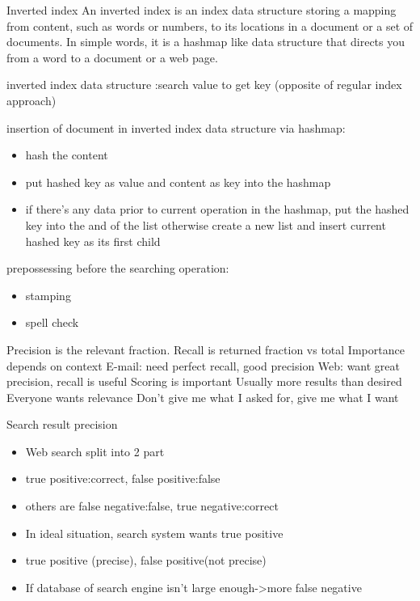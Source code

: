 \documentclass[fancy,11pt,titlestyle=display]{style/elegantbook}
\begin{document}
\begin{definition}{Inverted index}{}
An inverted index is an index data structure storing a mapping from content, such as words or numbers, to its locations in a document or a set of documents. In simple words, it is a hashmap like data structure that directs you from a word to a document or a web page.
\end{definition}


inverted index data structure :search value to get key (opposite of regular index approach)

insertion of document in inverted index data structure via hashmap:
\begin{itemize}
  \item hash the content
  \item put hashed key as value and content as key into the hashmap
  \item if there's any data prior to current operation in the hashmap, put the hashed key into the and of the list otherwise create a new list and insert current hashed key as its first child
    \end{itemize}


prepossessing before the searching operation:

\begin{itemize}
 \item stamping
 \item spell check
\end{itemize}

Precision is the relevant fraction.
Recall is returned fraction vs total
Importance depends on context
E-mail: need perfect recall, good precision
Web: want great precision, recall is useful
Scoring is important
Usually more results than desired
Everyone wants relevance
Don’t give me what I asked for, give me what I want


Search result precision
\begin{itemize}
\item Web search split into 2 part
\item true positive:correct, false positive:false
\item others are false negative:false, true negative:correct
\item In ideal situation, search system wants true positive
\item true positive (precise), false positive(not precise)		
\item If database of search engine isn't large enough->more false negative
\end{itemize}
\end{document}

